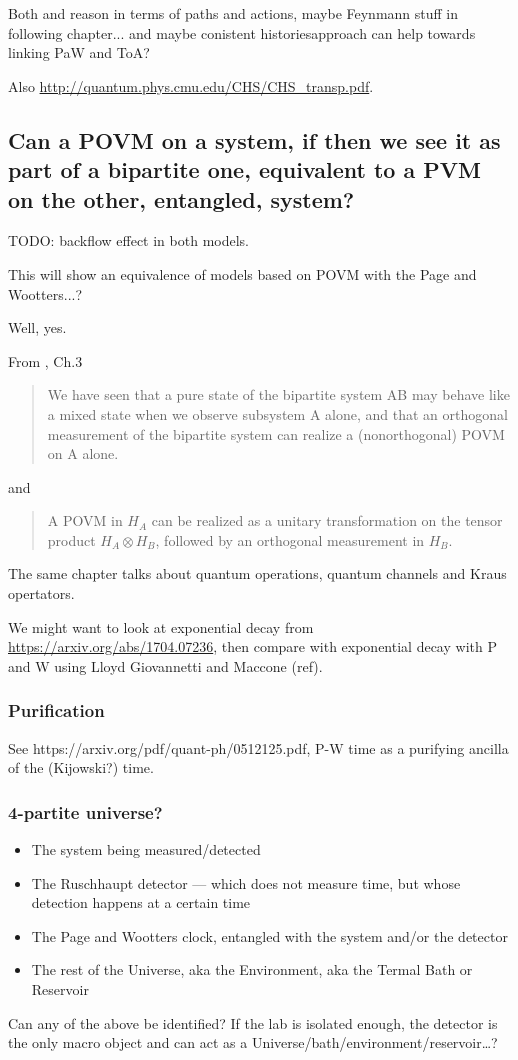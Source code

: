 Both \cite{YearsleyHalliwell_Clocks} and \cite{Gambini_PW}
reason in terms of paths and actions, maybe Feynmann stuff
in following chapter... and maybe conistent historiesapproach can help
towards linking PaW and ToA?

Also \url{http://quantum.phys.cmu.edu/CHS/CHS_transp.pdf}.

\subsection{Can a POVM on a system, if then we see it as part of a bipartite one,
equivalent to a PVM on the other, entangled, system?}

TODO: backflow effect in both models.

This will show an equivalence of models based on POVM with the Page and Wootters...?

Well, yes.

From \cite{PreskillNotes}, Ch.3 
\begin{quotation}
We have seen that
a pure state of the bipartite system AB may behave like a mixed state
when we observe subsystem A alone, and that an orthogonal measurement
of the bipartite system can realize a (nonorthogonal) POVM on A alone.
\end{quotation}

and

\begin{quotation}
A POVM in $H_A$ can be realized as a unitary transformation on the tensor
product $H_A \otimes H_B$, followed by an orthogonal measurement in $H_B$.
\end{quotation}

The same chapter talks about quantum operations, quantum channels and Kraus opertators.

We might want to look at exponential decay from \url{https://arxiv.org/abs/1704.07236},
then compare with exponential decay with P and W using Lloyd Giovannetti and Maccone (ref).

\subsubsection{Purification}

See https://arxiv.org/pdf/quant-ph/0512125.pdf, P-W time as a purifying ancilla
of the (Kijowski?) time.

\subsubsection{4-partite universe?}
\begin{itemize}
  \item{The system being measured/detected}
  \item{The Ruschhaupt detector --- which does not measure time, but whose detection happens at a certain time}
  \item{The Page and Wootters clock, entangled with the system and/or the detector}
  \item{The rest of the Universe, aka the Environment, aka the Termal Bath or Reservoir}
\end{itemize}

Can any of the above be identified? If the lab is isolated enough,
the detector is the only macro object and can act as a Universe/bath/environment/reservoir\dots?
